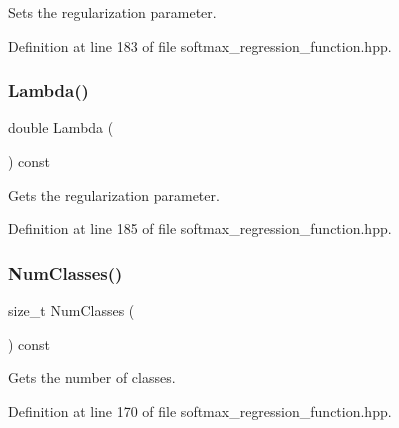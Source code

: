 Sets the regularization parameter. 



Definition at line 183 of file softmax\+\_\+regression\+\_\+function.\+hpp.

\mbox{\label{classmlpack_1_1regression_1_1SoftmaxRegressionFunction_a53535041275cedd0ec3de67ca032aa94}} 
\subsubsection{Lambda()\hspace{0.1cm}{\footnotesize\ttfamily [2/2]}}
{\footnotesize\ttfamily double Lambda (\begin{DoxyParamCaption}{ }\end{DoxyParamCaption}) const\hspace{0.3cm}{\ttfamily [inline]}}



Gets the regularization parameter. 



Definition at line 185 of file softmax\+\_\+regression\+\_\+function.\+hpp.

\mbox{\label{classmlpack_1_1regression_1_1SoftmaxRegressionFunction_a088ebfdf3c7a9e7eea81716d0c55b5a3}} 
\subsubsection{Num\+Classes()}
{\footnotesize\ttfamily size\+\_\+t Num\+Classes (\begin{DoxyParamCaption}{ }\end{DoxyParamCaption}) const\hspace{0.3cm}{\ttfamily [inline]}}



Gets the number of classes. 



Definition at line 170 of file softmax\+\_\+regression\+\_\+function.\+hpp.

